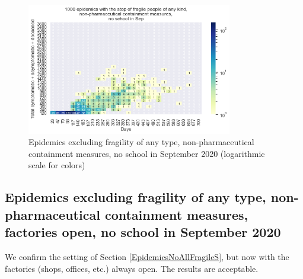 \documentclass[11pt]{article}
\begin{document}
\begin{figure}[H]
\begin{center}
\includegraphics[width=0.8\textwidth]{HM30_readRunResults1k_with_NoAllFrag_at20_plusHMlog.png}
\caption{Epidemics excluding fragility of any type, non-pharmaceutical containment measures, no school in September 2020 (logarithmic scale for colors)}
\label{EpidemicsNoAllFragileHM}
\end{center}
\end{figure}



\subsection{Epidemics excluding fragility of any type, non-pharmaceutical containment measures, factories open, no school in September 2020}
\label{EpidemicsNoAllFragileFacsOnS}

We confirm the setting of Section \ref{EpidemicsNoAllFragileS}, but now with the factories (shops, offices, etc.) always open. The results are acceptable.
\end{document}

